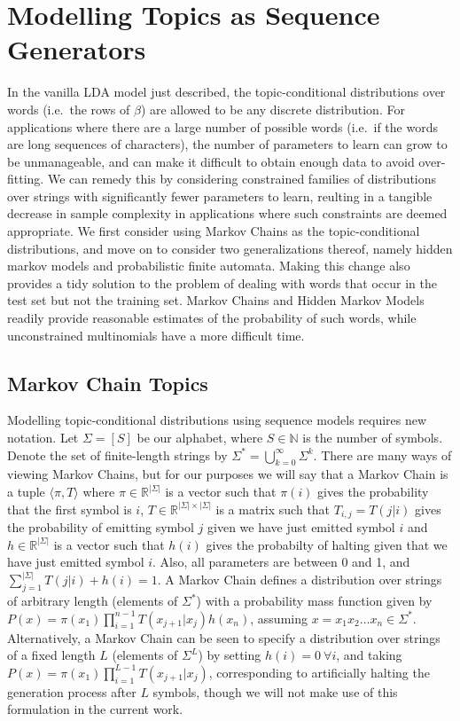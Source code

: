 

\section{Modelling Topics as Sequence Generators}
In the vanilla LDA model just described, the topic-conditional distributions over words (i.e.\ the rows of $\beta$) are allowed to be any discrete distribution. For applications where there are a large number of possible words (i.e.\ if the words are long sequences of characters), the number of parameters to learn can grow to be unmanageable, and can make it difficult to obtain enough data to avoid over-fitting. We can remedy this by considering constrained families of distributions over strings with significantly fewer parameters to learn, reulting in a tangible decrease in sample complexity in applications where such constraints are deemed appropriate. We first consider using Markov Chains as the topic-conditional distributions, and move on to consider two generalizations thereof, namely hidden markov models and probabilistic finite automata. Making this change also provides a tidy solution to the problem of dealing with words that occur in the test set but not the training set. Markov Chains and Hidden Markov Models readily provide reasonable estimates of the probability of such words, while unconstrained multinomials have a more difficult time.

\subsection{Markov Chain Topics}
Modelling topic-conditional distributions using sequence models requires new notation. Let $\Sigma = [S]$ be our alphabet, where $S \in \mathbb{N}$ is the number of symbols. Denote the set of finite-length strings by $\Sigma^* = \bigcup_{k=0}^\infty \Sigma^k$. There are many ways of viewing Markov Chains, but for our purposes we will say that a Markov Chain is a tuple $\langle \pi, T\rangle$ where $\pi \in \mathbb{R}^{|\Sigma|}$ is a vector such that $\pi(i)$ gives the probability that the first symbol is $i$, $T \in \mathbb{R}^{|\Sigma| \times |\Sigma|}$ is a matrix such that $T_{i,j} = T(j | i)$ gives the probability of emitting symbol $j$ given we have just emitted symbol $i$ and $h \in \mathbb{R}^{|\Sigma|}$ is a vector such that $h(i)$ gives the probabilty of halting given that we have just emitted symbol $i$. Also, all parameters are between 0 and 1, and $\sum_{j=1}^{|\Sigma|} T(j | i) + h(i) = 1$. A Markov Chain defines a distribution over strings of arbitrary length (elements of $\Sigma^*$) with a probability mass function given by $P(x) = \pi(x_1) \prod_{i=1}^{n-1} T(x_{j+1} | x_j) h(x_n)$, assuming $x = x_1x_2 \dots x_n \in \Sigma^*$. Alternatively, a Markov Chain can be seen to specify a distribution over strings of a fixed length $L$ (elements of $\Sigma^L$) by setting $h(i) = 0~\forall i$, and taking $P(x) = \pi(x_1) \prod_{i=1}^{L-1} T(x_{j+1} | x_j)$, corresponding to artificially halting the generation process after $L$ symbols, though we will not make use of this formulation in the current work.

